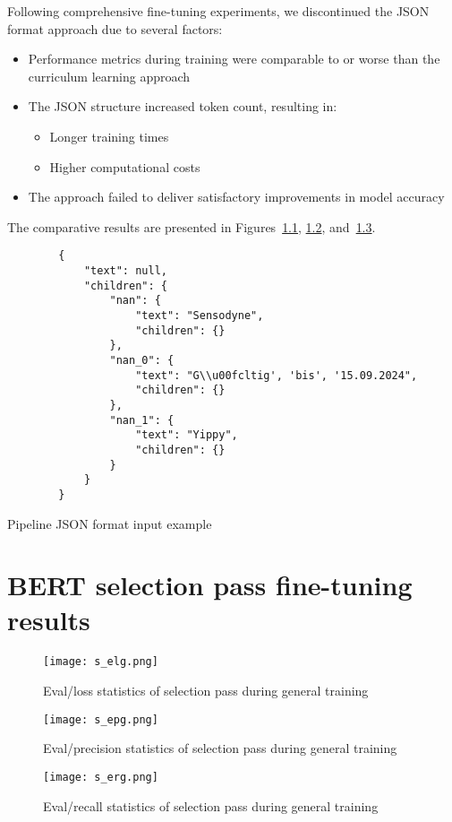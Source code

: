 \documentclass[licencjacka,en]{pracamgr}
\begin{document}
\begin{appendices}
Following comprehensive fine-tuning experiments, we discontinued the JSON format approach due to several factors:

\begin{itemize}
    \item Performance metrics during training were comparable to or worse than the curriculum learning approach
    \item The JSON structure increased token count, resulting in:
    \begin{itemize}
        \item Longer training times
        \item Higher computational costs
    \end{itemize}
    \item The approach failed to deliver satisfactory improvements in model accuracy
\end{itemize}

The comparative results are presented in Figures~\ref{fig:s_elg}, \ref{fig:s_epg}, and~\ref{fig:s_erg}.
\begin{center}
   \begin{listing}
        \begin{verbatim}
        {
            "text": null,
            "children": {
                "nan": {
                    "text": "Sensodyne",
                    "children": {}
                },
                "nan_0": {
                    "text": "G\\u00fcltig', 'bis', '15.09.2024",
                    "children": {}
                },
                "nan_1": {
                    "text": "Yippy",
                    "children": {}
                }
            }
        }
        \end{verbatim}
        \caption{Pipeline JSON format input example}
        \label{list:sel-json}
    \end{listing}
\end{center}

\chapter{BERT selection pass fine-tuning results} \label{AppC}
\begin{figure}[h]
    \centering
    \texttt{[image: s\_elg.png]}
    \caption{Eval/loss statistics of selection pass during general training}
    \label{fig:s_elg}
\end{figure}
\begin{figure}[h]
    \centering
    \texttt{[image: s\_epg.png]}
    \caption{Eval/precision statistics of selection pass during general training}
    \label{fig:s_epg}
\end{figure}
\begin{figure}[h]
    \centering
    \texttt{[image: s\_erg.png]}
    \caption{Eval/recall statistics of selection pass during general training}
    \label{fig:s_erg}
\end{figure}


\end{appendices}
\end{document}
